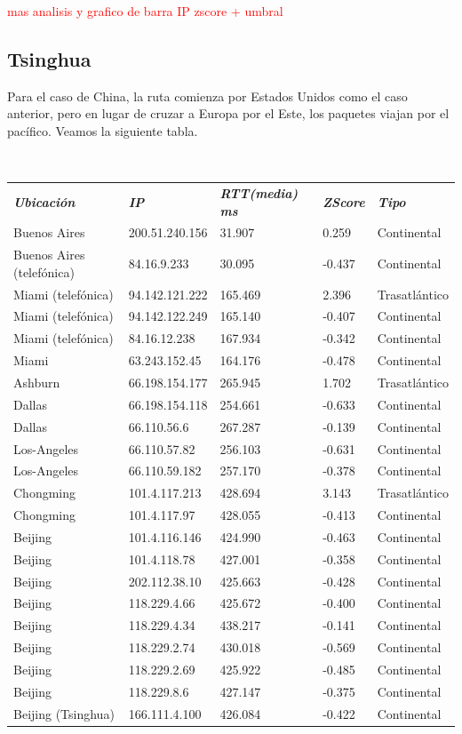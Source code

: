 \textcolor{red}{mas analisis y grafico de barra IP zscore + umbral}

\subsection{Tsinghua}

Para el caso de China, la ruta comienza por Estados Unidos como el caso anterior, pero en lugar de cruzar a Europa por el Este, los paquetes viajan por el pac\'ifico.
Veamos la siguiente tabla.

~

\begin{tabular}{lllll}
	\textit{\textbf{Ubicaci\'on}}	&	\textit{\textbf{IP}}	&	\textit{\textbf{RTT(media) ms}}	&	\textit{\textbf{ZScore}}	&	\textit{\textbf{Tipo}}	\\
	Buenos Aires			&	200.51.240.156	&	31.907	&	0.259	&	Continental	\\
	Buenos Aires (telef\'onica)	&	84.16.9.233	&	30.095	&	-0.437	&	Continental	\\
	Miami (telef\'onica)		&	94.142.121.222	&	165.469	&	2.396	&	Trasatl\'antico	\\
	Miami (telef\'onica)		&	94.142.122.249	&	165.140	&	-0.407	&	Continental	\\
	Miami (telef\'onica)		&	84.16.12.238	&	167.934	&	-0.342	&	Continental	\\
	Miami 				&	63.243.152.45	&	164.176	&	-0.478	&	Continental	\\
	Ashburn				&	66.198.154.177	&	265.945	&	1.702	&	Trasatl\'antico	\\
	Dallas				&	66.198.154.118	&	254.661	&	-0.633	&	Continental	\\
	Dallas				&	66.110.56.6	&	267.287	&	-0.139	&	Continental	\\
	Los-Angeles			&	66.110.57.82	&	256.103	&	-0.631	&	Continental	\\
	Los-Angeles			&	66.110.59.182	&	257.170	&	-0.378	&	Continental	\\
	Chongming				&	101.4.117.213	&	428.694	&	3.143	&	Trasatl\'antico	\\
	Chongming				&	101.4.117.97	&	428.055	&	-0.413	&	Continental	\\
	Beijing				&	101.4.116.146	&	424.990	&	-0.463	&	Continental	\\
	Beijing				&	101.4.118.78	&	427.001	&	-0.358	&	Continental	\\
	Beijing				&	202.112.38.10	&	425.663	&	-0.428	&	Continental	\\
	Beijing				&	118.229.4.66	&	425.672	&	-0.400	&	Continental	\\
	Beijing				&	118.229.4.34	&	438.217	&	-0.141	&	Continental	\\
	Beijing				&	118.229.2.74	&	430.018	&	-0.569	&	Continental	\\
	Beijing				&	118.229.2.69	&	425.922	&	-0.485	&	Continental	\\
	Beijing				&	118.229.8.6	&	427.147	&	-0.375	&	Continental	\\
	Beijing (Tsinghua)		&	166.111.4.100	&	426.084	&	-0.422	&	Continental	\\

\end{tabular}

